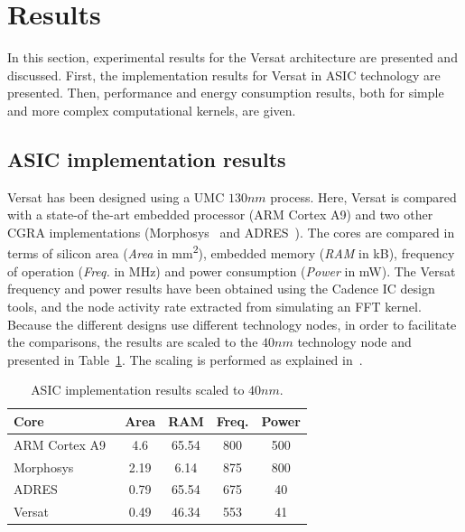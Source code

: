\documentclass[journal]{IEEEtran}
\begin{document}
\section{Results}
\label{sec:results}

In this section, experimental results for the Versat architecture are
presented and discussed. First, the implementation results for Versat
in ASIC technology are presented. Then, performance and energy
consumption results, both for simple and more complex computational
kernels, are given.

\subsection{ASIC implementation results}
\label{section:ASICresults}

Versat has been designed using a UMC $130nm$ process. Here, Versat is
compared with a state-of the-art embedded processor (ARM Cortex A9)
and two other CGRA implementations (Morphosys~\cite{Lee00} and
ADRES~\cite{Mei05}). The cores are compared in terms of silicon area
({\em Area} in mm\textsuperscript{2}), embedded memory ({\em RAM} in
kB), frequency of operation ({\em Freq.} in MHz) and power consumption
({\em Power} in mW). The Versat frequency and power results have been
obtained using the Cadence IC design tools, and the node activity rate
extracted from simulating an FFT kernel. Because the different designs
use different technology nodes, in order to facilitate the
comparisons, the results are scaled to the $40nm$ technology node and
presented in Table~\ref{tabASICrs}. The scaling is performed as
explained in~\cite{borkar99}.

\begin{table}[!h]
  \begin{center}
    \begin{tabular}{lcccc}
      Core & Area & RAM &  Freq. & Power\\
      \hline
      ARM Cortex A9~\cite{wang} &  4.6 & 65.54 & 800 & 500 \\
      Morphosys~\cite{Lee00}    & 2.19 &  6.14 & 875 & 800 \\
      ADRES~\cite{Mei05}        & 0.79 & 65.54 & 675 &  40 \\
      Versat                    & 0.49 & 46.34 & 553 &  41 \\
      \hline
    \end{tabular}
  \end{center}
  \caption[Table caption shown in TOC]{ASIC implementation results scaled to $40nm$.}
  \label{tabASICrs}
\end{table}
\end{document}
